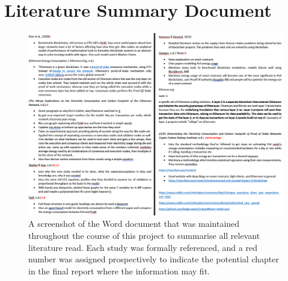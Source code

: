 \chapter{Literature Summary Document}


\begin{figure}[!htb]
    \includegraphics[width=18cm,center]{Figures/PapersSummary.png}
    \caption{A screenshot of the Word document that was maintained throughout the course of this project to summarise all relevant literature read. Each study was formally referenced, and a red number was assigned prospectively to indicate the potential chapter in the final report where the information may fit.}
    \label{Figure:PapersSummary}
\end{figure}
